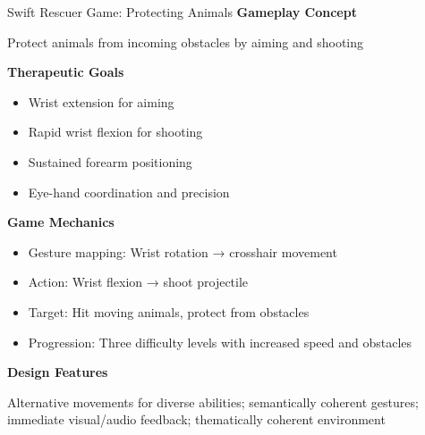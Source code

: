 \begin{frame}{Swift Rescuer Game: Protecting Animals}
	\textbf{\textcolor{gbAqua}{Gameplay Concept}}
	
	Protect animals from incoming obstacles by aiming and shooting
	
	\vspace{0.2cm}
	
	\textbf{\textcolor{gbAqua}{Therapeutic Goals}}
	
	\begin{itemize}
		\item Wrist extension for aiming
		\item Rapid wrist flexion for shooting
		\item Sustained forearm positioning
		\item Eye-hand coordination and precision
	\end{itemize}
	
	\vspace{0.2cm}
	
	\textbf{\textcolor{gbAqua}{Game Mechanics}}
	
	\begin{itemize}
		\item Gesture mapping: Wrist rotation → crosshair movement
		\item Action: Wrist flexion → shoot projectile
		\item Target: Hit moving animals, protect from obstacles
		\item Progression: Three difficulty levels with increased speed and obstacles
	\end{itemize}
	
	\vspace{0.2cm}
	
	\textbf{\textcolor{gbAqua}{Design Features}}
	
	Alternative movements for diverse abilities; semantically coherent gestures; immediate visual/audio feedback; thematically coherent environment
\end{frame}


